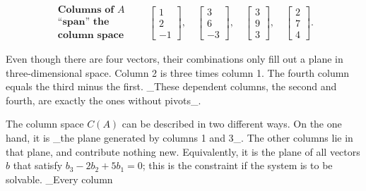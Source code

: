 \[\begin{array}{c}\textbf{Columns of }A\\ \textbf{``span'' the}\\ \textbf{column space}\end{array}\qquad\begin{bmatrix}1\\ 2\\ -1\end{bmatrix},\quad\begin{bmatrix}3\\ 6\\ -3\end{bmatrix},\quad\begin{bmatrix}3\\ 9\\ 3\end{bmatrix},\quad\begin{bmatrix}2\\ 7\\ 4\end{bmatrix}.\]

Even though there are four vectors, their combinations only fill out a plane in three-dimensional space. Column 2 is three times column 1. The fourth column equals the third minus the first. _These dependent columns, the second and fourth, are exactly the ones without pivots_.

The column space \(C(A)\) can be described in two different ways. On the one hand, it is _the plane generated by columns 1 and 3_. The other columns lie in that plane, and contribute nothing new. Equivalently, it is the plane of all vectors \(b\) that satisfy \(b_{3}-2b_{2}+5b_{1}=0\); this is the constraint if the system is to be solvable. _Every column 